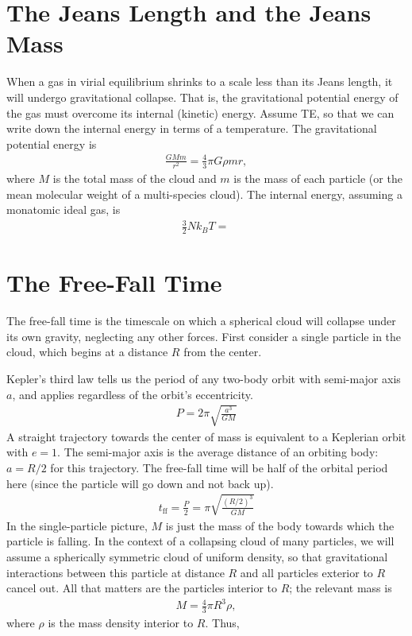 \section{The Jeans Length and the Jeans Mass}
When a gas in virial equilibrium shrinks to a scale less than its Jeans length, it will undergo gravitational collapse. That is, the gravitational potential energy of the gas must overcome its internal (kinetic) energy. Assume TE, so that we can write down the internal energy in terms of a temperature. The gravitational potential energy is
\begin{align}
    \frac{G M m}{r^2} = \tfrac{4}{3} \pi G \rho m r,
\end{align}
where $M$ is the total mass of the cloud and $m$ is the mass of each particle (or the mean molecular weight of a multi-species cloud). The internal energy, assuming a monatomic ideal gas, is
\begin{align}
    \tfrac{3}{2} N k_B T = \frac{}{}
\end{align}


\section{The Free-Fall Time}
The free-fall time is the timescale on which a spherical cloud will collapse under its own gravity, neglecting any other forces. First consider a single particle in the cloud, which begins at a distance $R$ from the center.

Kepler's third law tells us the period of any two-body orbit with semi-major axis $a$, and applies regardless of the orbit's eccentricity.
\begin{align}
    P = 2\pi \sqrt{\frac{a^3}{G M}}
\end{align}
A straight trajectory towards the center of mass is equivalent to a Keplerian orbit with $e = 1$. The semi-major axis is the average distance of an orbiting body: $a = R/2$ for this trajectory. The free-fall time will be half of the orbital period here (since the particle will go down and not back up).
\begin{align}
    t_\text{ff} = \frac{P}{2} = \pi \sqrt{\frac{(R/2)^3}{G M}}
\end{align}
In the single-particle picture, $M$ is just the mass of the body towards which the particle is falling. In the context of a collapsing cloud of many particles, we will assume a spherically symmetric cloud of uniform density, so that gravitational interactions between this particle at distance $R$ and all particles exterior to $R$ cancel out. All that matters are the particles interior to $R$; the relevant mass is
\begin{align}
    M = \tfrac{4}{3} \pi R^3 \rho,
\end{align}
where $\rho$ is the mass density interior to $R$. Thus,


